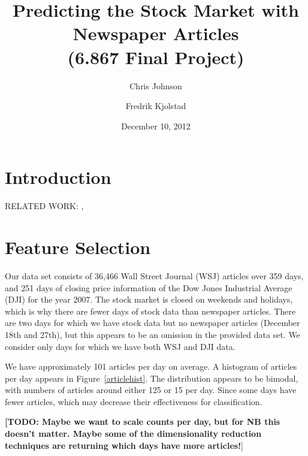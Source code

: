 \documentclass[10pt]{article}
\def\TODO#1{\noindent\textbf{[TODO: #1}]}
\begin{document}
\title{Predicting the Stock Market with Newspaper Articles\\ (6.867 Final Project)}
\author{Chris Johnson \and Fredrik Kjolstad}
\date{December 10, 2012}
\maketitle

\begin{abstract}

\end{abstract}

\section{Introduction}

RELATED WORK: \cite{twitter}, \cite{mlstockmarket}

\section{Feature Selection}

Our data set consists of 36,466 Wall Street Journal (WSJ) articles over 359 days, and 251 days of closing price information of the Dow Jones Industrial Average (DJI) for the year 2007. The stock market is closed on weekends and holidays, which is why there are fewer days of stock data than newspaper articles. There are two days for which we have stock data but no newspaper articles (December 18th and 27th), but this appears to be an omission in the provided data set. We consider only days for which we have both WSJ and DJI data. 

We have approximately 101 articles per day on average. A histogram of articles per day appears in Figure~\ref{articlehist}. The distribution appears to be bimodal, with numbers of articles around either 125 or 15 per day. Since some days have fewer articles, which may decrease their effectiveness for classification. 

\TODO{Maybe we want to scale counts per day, but for NB this doesn't matter. Maybe some of the dimensionality reduction techniques are returning which days have more articles!}
\end{document}
